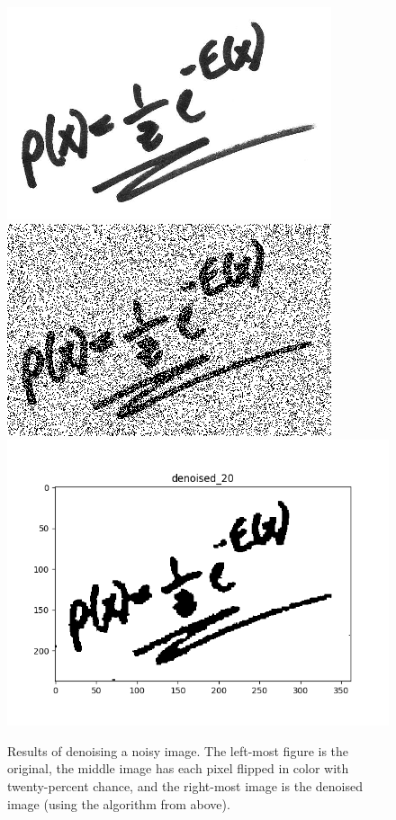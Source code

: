 \documentclass[12pt]{article}
\begin{document}
\begin{enumerate}[label=(\alph*)]
\begin{figure}[!ht]
\centering
\includegraphics[scale=0.33]{programming/orig.png}
\includegraphics[scale=0.33]{programming/noisy_20.png}
\includegraphics[scale=0.33]{programming/denoised_20.png}
\caption{Results of denoising a noisy image. The left-most figure is the original, the middle image has each pixel flipped in color with twenty-percent chance, and the right-most image is the denoised image (using the algorithm from above).}
\label{fig:denoised_20}
\end{figure}


\end{enumerate}
\end{document}
